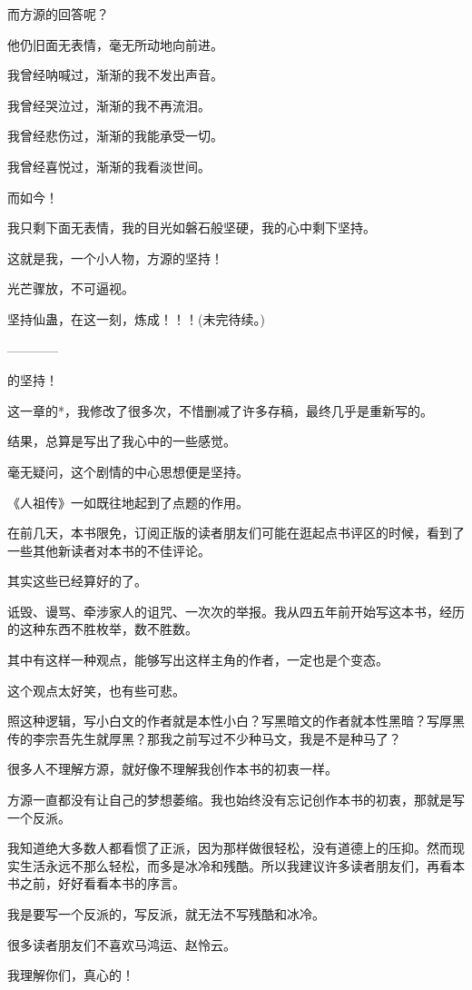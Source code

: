 \begin{this_body}
而方源的回答呢？

他仍旧面无表情，毫无所动地向前进。

我曾经呐喊过，渐渐的我不发出声音。

我曾经哭泣过，渐渐的我不再流泪。

我曾经悲伤过，渐渐的我能承受一切。

我曾经喜悦过，渐渐的我看淡世间。

而如今！

我只剩下面无表情，我的目光如磐石般坚硬，我的心中剩下坚持。

这就是我，一个小人物，方源的坚持！

光芒骤放，不可逼视。

坚持仙蛊，在这一刻，炼成！！！(未完待续。)

------------

的坚持！

这一章的*，我修改了很多次，不惜删减了许多存稿，最终几乎是重新写的。

结果，总算是写出了我心中的一些感觉。

毫无疑问，这个剧情的中心思想便是坚持。

《人祖传》一如既往地起到了点题的作用。

在前几天，本书限免，订阅正版的读者朋友们可能在逛起点书评区的时候，看到了一些其他新读者对本书的不佳评论。

其实这些已经算好的了。

诋毁、谩骂、牵涉家人的诅咒、一次次的举报。我从四五年前开始写这本书，经历的这种东西不胜枚举，数不胜数。

其中有这样一种观点，能够写出这样主角的作者，一定也是个变态。

这个观点太好笑，也有些可悲。

照这种逻辑，写小白文的作者就是本性小白？写黑暗文的作者就本性黑暗？写厚黑传的李宗吾先生就厚黑？那我之前写过不少种马文，我是不是种马了？

很多人不理解方源，就好像不理解我创作本书的初衷一样。

方源一直都没有让自己的梦想萎缩。我也始终没有忘记创作本书的初衷，那就是写一个反派。

我知道绝大多数人都看惯了正派，因为那样做很轻松，没有道德上的压抑。然而现实生活永远不那么轻松，而多是冰冷和残酷。所以我建议许多读者朋友们，再看本书之前，好好看看本书的序言。

我是要写一个反派的，写反派，就无法不写残酷和冰冷。

很多读者朋友们不喜欢马鸿运、赵怜云。

我理解你们，真心的！


\end{this_body}
